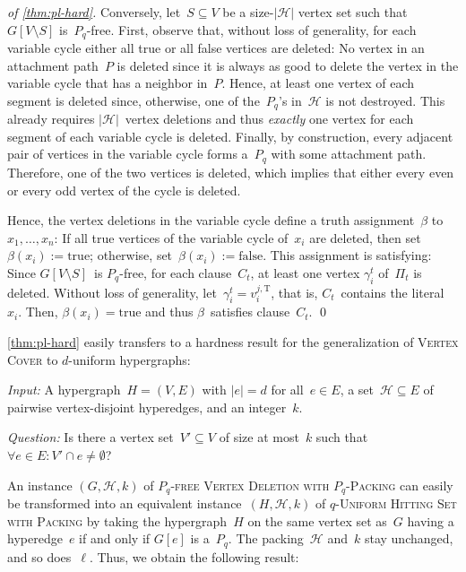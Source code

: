 \documentclass[envcountsame,numbook,smallextended]{svjour3}
\numberwithin{equation}{section}
\numberwithin{figure}{section}
\newcommand{\decprob}[3]{\pagebreak[3]
  \begin{problem}[\boldmath#1]
    \begin{compactdesc}
        \item[\normalfont\it Input:] #2
        \item[\normalfont\it Question:] #3
    \end{compactdesc}
  \end{problem}
}
\newcommand{\num}{\ensuremath{\gamma}}
\newcommand{\true}{\ensuremath{\mathrm{true}}}
\newcommand{\false}{\ensuremath{\mathrm{false}}}
\newcommand{\packing}{\ensuremath{\mathcal H}}
\newcommand{\PLVD}{\textsc{\ensuremath{P_q}-free Vertex Deletion with  \ensuremath{P_q}-Packing}}
\begin{document}
\begin{proof}[of \cref{thm:pl-hard}]
  Conversely,
  let~$S\subseteq V$ be a size-$|\packing|$ vertex set
  such that~$G[V\setminus S]$ is~$P_q$-free.
  First, observe that,
  without loss of generality,
  for each variable cycle
  either all true or all false vertices are deleted:
  No vertex in an attachment path~$P$ is deleted
  since it is always as good to delete
  the vertex in the variable cycle
  that has a neighbor in~$P$.
  Hence, at least one vertex of each segment is deleted
  since, otherwise,
  one of the~$P_q$'s in~$\packing$ is not destroyed.
  This already requires $|\packing|$~vertex deletions
  and thus \emph{exactly} one vertex for each segment
  of each variable cycle
  is deleted.
  Finally, by construction,
  every adjacent pair of vertices in the variable cycle
  forms a~$P_q$ with some attachment path.
  Therefore, one of the two vertices is deleted,
  which implies that either every even or every odd vertex
  of the cycle is deleted. 

  Hence, the vertex deletions in the variable cycle
  define a truth assignment~$\beta$ to~$x_1,\ldots , x_n$:
  If all true vertices of the variable cycle of~$x_i$ are deleted, 
  then set~$\beta(x_i):=\true$;
  otherwise, set~$\beta(x_i):=\false$.
  This assignment is satisfying:
  Since $G[V\setminus S]$~is $P_q$-free, for each clause~$C_t$,
  at least one vertex $\num_i^t$ of~$\Pi_t$ is deleted.
  Without loss of generality,
  let~$\num_i^t= v_i^{j,\text{T}}$, that is,
  $C_t$~contains the literal~$x_i$.
  Then, $\beta(x_i)=\true$ and thus $\beta$~satisfies clause~$C_t$.
\qed\end{proof}

\noindent \cref{thm:pl-hard} easily transfers to a hardness result for the generalization of \textsc{Vertex Cover} to \(d\)-uniform hypergraphs:

\decprob{\boldmath$d$-\textsc{Uniform Hitting
    Set with Packing}} {A hypergraph~$H=(V,E)$ with $|e|=d$ for
  all~$e\in E$, a set~$\packing\subseteq E$ of pairwise
  vertex-disjoint hyperedges, and an integer~$k$.}{Is there a vertex
  set~$V'\subseteq V$ of size at most~$k$ such that~$\forall e\in E:
  V'\cap e\neq \emptyset$?}

\noindent An instance \((G,\packing,k)\) of \PLVD{} can easily be transformed into an equivalent instance~\((H,\packing,k)\) of \(q\)-\textsc{Uniform Hitting Set with Packing} by taking the hypergraph~\(H\) on the same vertex set as~\(G\) having a hyperedge~\(e\) if and only if \(G[e]\) is a~\(P_q\).  The packing~\(\packing\) and~\(k\) stay unchanged, and so does~\(\ell\).  Thus, we obtain the following result:
\end{document}
